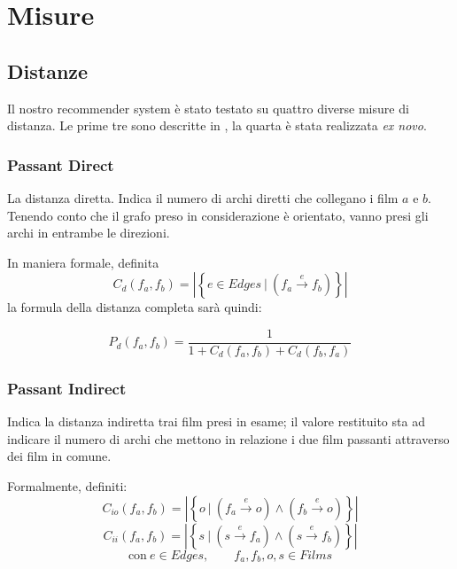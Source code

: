 \section{Misure}

\subsection{Distanze}

Il nostro recommender system è stato testato su quattro diverse misure di distanza.
Le prime tre sono descritte in \citet{passant2010measuring}, la quarta è stata realizzata \emph{ex novo}.



\subsubsection{Passant Direct}
La distanza diretta. Indica il numero di archi diretti che collegano i film $a$ e $b$. Tenendo conto che il grafo preso in considerazione è orientato, vanno presi gli archi in entrambe le direzioni.

In maniera formale, definita $$C_{d}(f_a,f_b) = \left\vert \left\{ e \in Edges \  | \  (f_a \xrightarrow{~e~} f_b ) \right\} \right\vert$$ la formula della distanza completa sarà quindi:


    \begin{equation}
        P_{d}(f_{a},f_{b}) = \frac{1} {1+C_{d}(f_{a},f_{b})+C_{d}(f_{b},f_{a})}
    \end{equation}



\subsubsection{Passant Indirect}
\label{PassantI}
Indica la distanza indiretta trai film presi in esame; il valore restituito sta ad indicare il numero di archi che mettono in relazione i due film passanti attraverso dei film in comune.

Formalmente, definiti:
$$C_{io}(f_a,f_b) = \left\vert \left\{ o \  | \  (f_a \xrightarrow{~e~} o ) \wedge (f_b \xrightarrow{~e~} o) \right\} \right\vert$$
$$C_{ii}(f_a,f_b) = \left\vert \left\{ s \  | \  ( s \xrightarrow{~e~} f_a ) \wedge ( s \xrightarrow{~e~} f_b) \right\} \right\vert$$ 
$$\text{con} \ e \in Edges  , \qquad f_a,f_b,o,s \in Films $$

